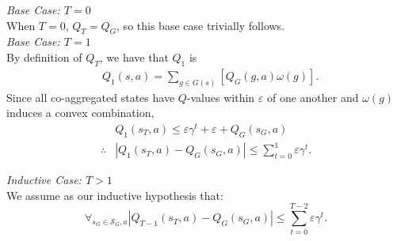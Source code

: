 \noindent \textit{Base Case: $T = 0$} \\

\noindent When $T = 0$, $Q_T = Q_G$, so this base case trivially follows. \\

\noindent \textit{Base Case: $T = 1$} \\

By definition of $Q_T$, we have that $Q_1$ is
\begin{align*}
&Q_1(s,a) = \underset{g \in G(s)}{\sum} \left[ Q_G(g,a) \omega(g) \right].
\end{align*}
Since all co-aggregated states have $Q$-values within $\varepsilon$ of one another and $\omega(g)$ induces a convex combination,
\begin{align*}
&Q_1(s_T,a) \leq \varepsilon \gamma^t + \varepsilon + Q_G(s_G, a) \\
\therefore& \left| Q_{1}(s_T, a) - Q_G(s_G,a) \right| \leq \sum_{t=0}^{1}\varepsilon \gamma^t.
\end{align*}

\noindent \textit{Inductive Case: $T > 1$} \\

We assume as our inductive hypothesis that:
\begin{equation*}
\forall_{s_G \in \mathcal{S}_G, a} |Q_{T-1}(s_T, a) - Q_G(s_G, a) | \leq \sum_{t=0}^{T-2} \varepsilon \gamma^t.
\end{equation*}

